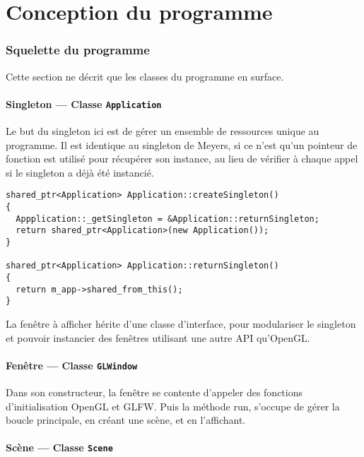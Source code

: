 \documentclass[pdftex, 11pt, a4paper, titlepage]{article}
\begin{document}
\pagebreak

\part{Conception du programme}

\section{Squelette du programme}

Cette section ne décrit que les classes du programme en surface.

\subsection{Singleton --- Classe \texttt{Application}}

Le but du singleton ici est de gérer un ensemble de ressources unique
au programme.  Il est identique au singleton de Meyers, si ce n'est
qu'un pointeur de fonction est utilisé pour récupérer son instance, au
lieu de vérifier à chaque appel si le singleton a déjà été instancié.

\lstset{language=C++}

\begin{lstlisting}
shared_ptr<Application> Application::createSingleton()
{
  Appplication::_getSingleton = &Application::returnSingleton;
  return shared_ptr<Application>(new Application());
}

shared_ptr<Application> Application::returnSingleton()
{
  return m_app->shared_from_this();
}
\end{lstlisting}

La fenêtre à afficher hérite d'une classe d'interface, pour
modulariser le singleton et pouvoir instancier des fenêtres utilisant
une autre API qu'OpenGL.

\subsection{Fenêtre --- Classe \texttt{GLWindow}}

Dans son constructeur, la fenêtre se contente d'appeler des fonctions
d'initialisation OpenGL et GLFW. Puis la méthode run, s'occupe de
gérer la boucle principale, en créant une scène, et en l'affichant.

\subsection{Scène --- Classe \texttt{Scene}}
\end{document}
